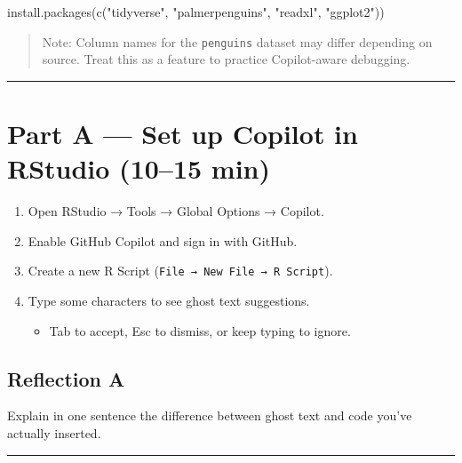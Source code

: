 \documentclass[
  letterpaper,
  DIV=11,
  numbers=noendperiod]{scrreprt}
\newenvironment{Shaded}{\begin{snugshade}}{\end{snugshade}}
\newcommand{\FunctionTok}[1]{\textcolor[rgb]{0.28,0.35,0.67}{#1}}
\newcommand{\NormalTok}[1]{\textcolor[rgb]{0.00,0.23,0.31}{#1}}
\newcommand{\StringTok}[1]{\textcolor[rgb]{0.13,0.47,0.30}{#1}}
\providecommand{\tightlist}{%
  \setlength{\itemsep}{0pt}\setlength{\parskip}{0pt}}
\begin{document}
\begin{Shaded}
\begin{Highlighting}[]
\FunctionTok{install.packages}\NormalTok{(}\FunctionTok{c}\NormalTok{(}\StringTok{"tidyverse"}\NormalTok{, }\StringTok{"palmerpenguins"}\NormalTok{, }\StringTok{"readxl"}\NormalTok{, }\StringTok{"ggplot2"}\NormalTok{))}
\end{Highlighting}
\end{Shaded}

\begin{quote}
Note: Column names for the \texttt{penguins} dataset may differ
depending on source. Treat this as a feature to practice Copilot-aware
debugging.
\end{quote}

\begin{center}\rule{0.5\linewidth}{0.5pt}\end{center}

\section{Part A --- Set up Copilot in RStudio (10--15
min)}\label{part-a-set-up-copilot-in-rstudio-1015-min}

\begin{enumerate}
\def\labelenumi{\arabic{enumi}.}
\tightlist
\item
  Open RStudio → Tools → Global Options → Copilot.
\item
  Enable GitHub Copilot and sign in with GitHub.
\item
  Create a new R Script (\texttt{File\ →\ New\ File\ →\ R\ Script}).
\item
  Type some characters to see ghost text suggestions.

  \begin{itemize}
  \tightlist
  \item
    Tab to accept, Esc to dismiss, or keep typing to ignore.
  \end{itemize}
\end{enumerate}

\subsection{Reflection A}\label{reflection-a}

Explain in one sentence the difference between ghost text and code
you've actually inserted.

\begin{center}\rule{0.5\linewidth}{0.5pt}\end{center}
\end{document}
